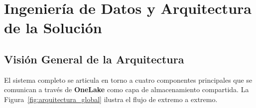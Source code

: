 \documentclass[12pt,oneside,a4paper]{report}
\renewcommand{\_}{\textunderscore\allowbreak}
\begin{document}
\chapter{Ingeniería de Datos y Arquitectura de la Solución}
\label{cap:ingenieria}

\section{Visión General de la Arquitectura}
\label{sec:vision_general}

El sistema completo se articula en torno a cuatro componentes principales que se comunican a través de \textbf{OneLake} como capa de almacenamiento compartida. La Figura~\ref{fig:arquitectura_global} ilustra el flujo de extremo a extremo.
\end{document}
